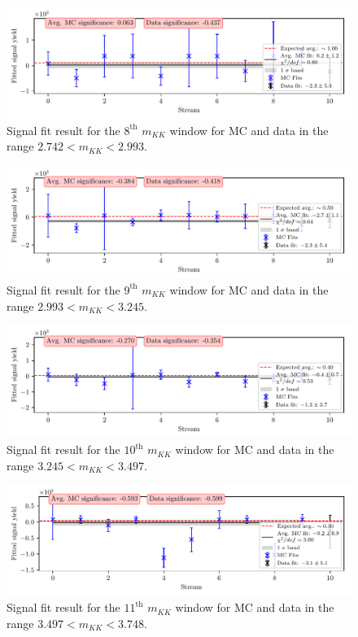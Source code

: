 \begin{figure}[H]
	\centering
	\captionsetup{width=0.8\linewidth}
	\includegraphics[width=\linewidth]{fig/sig_mKK_8}
	\caption{Signal fit result for the $8^{\mathrm{th}}$ $m_{KK}$ window for MC and data in the range $2.742<m_{KK}<2.993$.}
\end{figure}

\begin{figure}[H]
	\centering
	\captionsetup{width=0.8\linewidth}
	\includegraphics[width=\linewidth]{fig/sig_mKK_9}
	\caption{Signal fit result for the $9^{\mathrm{th}}$ $m_{KK}$ window for MC and data in the range $2.993<m_{KK}<3.245$.}
\end{figure}

\begin{figure}[H]
	\centering
	\captionsetup{width=0.8\linewidth}
	\includegraphics[width=\linewidth]{fig/sig_mKK_10}
	\caption{Signal fit result for the $10^{\mathrm{th}}$ $m_{KK}$ window for MC and data in the range $3.245<m_{KK}<3.497$.}
\end{figure}

\begin{figure}[H]
	\centering
	\captionsetup{width=0.8\linewidth}
	\includegraphics[width=\linewidth]{fig/sig_mKK_11}
	\caption{Signal fit result for the $11^{\mathrm{th}}$ $m_{KK}$ window for MC and data in the range $3.497<m_{KK}<3.748$.}
\end{figure}


